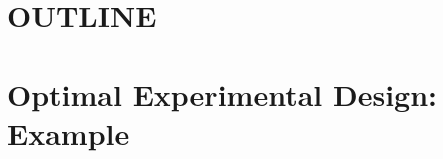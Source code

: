 \documentclass[preprint,review,12pt]{elsarticle}
\begin{document}


% 

\section{OUTLINE}





\section{Optimal Experimental Design: Example}
\label{S:2}
\end{document}
